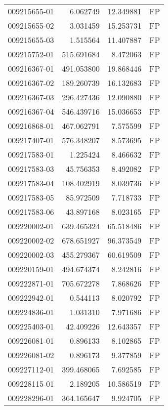 \begin{tabular}{lrrl}
009215655-01 &    6.062749 &      12.349881 &   FP \\
009215655-02 &    3.031459 &      15.253731 &   FP \\
009215655-03 &    1.515564 &      11.407887 &   FP \\
009215752-01 &  515.691684 &       8.472063 &   FP \\
009216367-01 &  491.053800 &      19.868446 &   FP \\
009216367-02 &  189.260739 &      16.132683 &   FP \\
009216367-03 &  296.427436 &      12.090880 &   FP \\
009216367-04 &  546.439716 &      15.036653 &   FP \\
009216868-01 &  467.062791 &       7.575599 &   FP \\
009217407-01 &  576.348207 &       8.573695 &   FP \\
009217583-01 &    1.225424 &       8.466632 &   FP \\
009217583-03 &   45.756353 &       8.492082 &   FP \\
009217583-04 &  108.402919 &       8.039736 &   FP \\
009217583-05 &   85.972509 &       7.718733 &   FP \\
009217583-06 &   43.897168 &       8.023165 &   FP \\
009220002-01 &  639.465324 &      65.518486 &   FP \\
009220002-02 &  678.651927 &      96.373549 &   FP \\
009220002-03 &  455.279367 &      60.619509 &   FP \\
009220159-01 &  494.674374 &       8.242816 &   FP \\
009222871-01 &  705.672278 &       7.868626 &   FP \\
009222942-01 &    0.544113 &       8.020792 &   FP \\
009224836-01 &    1.031310 &       7.971686 &   FP \\
009225403-01 &   42.409226 &      12.643357 &   FP \\
009226081-01 &    0.896133 &       8.102865 &   FP \\
009226081-02 &    0.896173 &       9.377859 &   FP \\
009227112-01 &  399.468065 &       7.692585 &   FP \\
009228115-01 &    2.189205 &      10.586519 &   FP \\
009228296-01 &  364.165647 &       9.924705 &   FP \\

\end{tabular}
